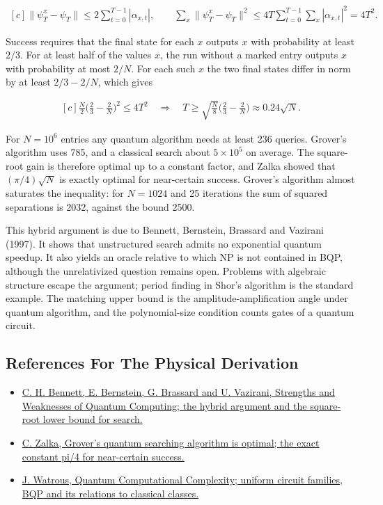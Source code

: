 \documentclass[11pt,oneside]{book}
\newenvironment{centeredalign}{\[\begin{gathered}[c]}{\end{gathered}\]}
\begin{document}
\begin{centeredalign}
\big\|\psi_T^x-\psi_T\big\|\leq2\sum_{t=0}^{T-1}|\alpha_{x,t}|,\qquad
\sum_x\big\|\psi_T^x-\psi_T\big\|^2\leq4T\sum_{t=0}^{T-1}\sum_x|\alpha_{x,t}|^2=4T^2.
\end{centeredalign}

Success requires that the final state for each \(x\) outputs \(x\) with probability at least \(2/3\). For at least half of the values \(x\), the run without a marked entry outputs \(x\) with probability at most \(2/N\). For each such \(x\) the two final states differ in norm by at least \(2/3-2/N\), which gives

\begin{centeredalign}
\frac N2\Big(\frac23-\frac2N\Big)^2\leq4T^2\quad\Longrightarrow\quad
T\geq\sqrt{\frac N8}\Big(\frac23-\frac2N\Big)\approx0.24\sqrt N.
\end{centeredalign}

For \(N=10^6\) entries any quantum algorithm needs at least 236 queries. Grover's algorithm uses 785, and a classical search about \(5\times10^5\) on average. The square-root gain is therefore optimal up to a constant factor, and Zalka showed that \((\pi/4)\sqrt N\) is exactly optimal for near-certain success. Grover's algorithm almost saturates the inequality: for \(N=1024\) and 25 iterations the sum of squared separations is 2032, against the bound 2500.

This hybrid argument is due to Bennett, Bernstein, Brassard and Vazirani (1997). It shows that unstructured search admits no exponential quantum speedup. It also yields an oracle relative to which NP is not contained in BQP, although the unrelativized question remains open. Problems with algebraic structure escape the argument; period finding in Shor's algorithm is the standard example. The matching upper bound is the amplitude-amplification angle under quantum algorithm, and the polynomial-size condition counts gates of a quantum circuit.

\subsection*{References For The Physical Derivation}
\begin{itemize}
\item \href{https://arxiv.org/abs/quant-ph/9701001}{C. H. Bennett, E. Bernstein, G. Brassard and U. Vazirani, Strengths and Weaknesses of Quantum Computing; the hybrid argument and the square-root lower bound for search.}
\item \href{https://arxiv.org/abs/quant-ph/9711070}{C. Zalka, Grover's quantum searching algorithm is optimal; the exact constant pi/4 for near-certain success.}
\item \href{https://arxiv.org/abs/0804.3401}{J. Watrous, Quantum Computational Complexity; uniform circuit families, BQP and its relations to classical classes.}
\end{itemize}
\end{document}
